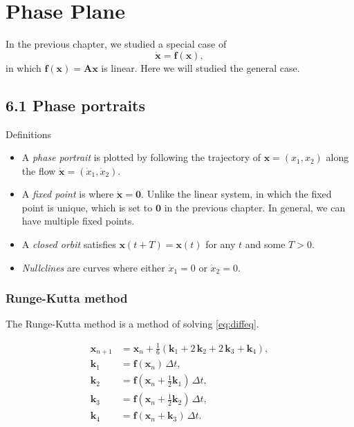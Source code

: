 \documentclass{book}
\begin{document}
\chapter{Phase Plane}

In the previous chapter, we studied a special case of
\begin{equation}
  \mathbf{\dot x} = \mathbf f(\mathbf x),
  \label{eq:diffeq}
\end{equation}
in which $\mathbf f(\mathbf x) = \mathbf A \mathbf x$ is linear.
Here we will studied the general case.


\section{6.1 Phase portraits}

Definitions

\begin{itemize}

\item
A \emph{phase portrait} is plotted by following the trajectory of
$\mathbf x = (x_1, x_2)$ along the flow $\mathbf{\dot x} = (\dot x_1, \dot x_2)$.

\item
A \emph{fixed point} is where $\mathbf{\dot x} = \mathbf 0$.
Unlike the linear system, in which the fixed point is unique,
which is set to $\mathbf 0$ in the previous chapter.
In general, we can have multiple fixed points.

\item
A \emph{closed orbit} satisfies $\mathbf x(t + T) = \mathbf x(t)$ for any $t$
and some $T > 0$.

\item
\emph{Nullclines} are curves where either $\dot x_1 = 0$ or $\dot x_2 = 0$.

\end{itemize}


\subsection{Runge-Kutta method}

The Runge-Kutta method is a method of solving \eqref{eq:diffeq}.

$$
\begin{aligned}
\mathbf x_{n+1} &= \mathbf x_n + \frac{1}{6} (\mathbf k_1 + 2 \, \mathbf k_2 + 2 \, \mathbf k_3 + \mathbf k_4), \\
\mathbf k_1 &= \mathbf f(\mathbf x_n) \, \Delta t, \\
\mathbf k_2 &= \mathbf f(\mathbf x_n + \frac 1 2 \mathbf k_1) \, \Delta t, \\
\mathbf k_3 &= \mathbf f(\mathbf x_n + \frac 1 2 \mathbf k_2) \, \Delta t, \\
\mathbf k_4 &= \mathbf f(\mathbf x_n + \mathbf k_3) \, \Delta t.
\end{aligned}
$$
\end{document}
